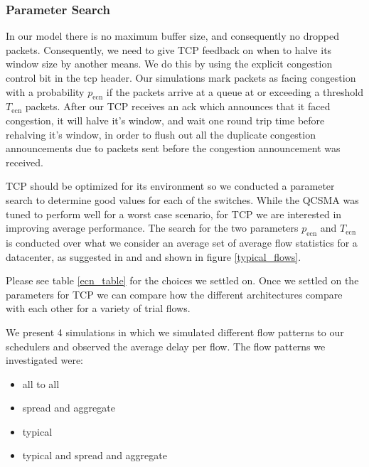 \documentclass{IEEEtran}%
\begin{document}
\subsubsection{Parameter Search}

In our model there is no maximum buffer size, and consequently no dropped packets.  Consequently, we need to give TCP feedback on when to halve its window size by another means.  We do this by using the explicit congestion control bit in the tcp header.  Our simulations mark packets as facing congestion with a probability $p_{\text{ecn}}$ if the packets arrive at a queue at or exceeding a threshold $T_{\text{ecn}}$ packets.  After our TCP receives an ack which announces that it faced congestion, it will halve it's window, and wait one round trip time before rehalving it's window, in order to flush out all the duplicate congestion announcements due to packets sent before the congestion announcement was received.

  TCP should be optimized for its environment so we conducted a parameter search to determine good values for each of the switches.  While the QCSMA was tuned to perform well for a worst case scenario, for TCP we are interested in improving average performance.  The search for the two parameters $p_{\text{ecn}}$ and $T_{\text{ecn}}$ is conducted over what we consider an average set of average flow statistics for a datacenter, as suggested in \cite{Benson} and \cite{Kandula} and shown in figure \ref{typical_flows}.

Please see table \ref{ecn_table} for the choices we settled on.  Once we settled on the parameters for TCP we can compare how the different architectures compare with each other for a variety of trial flows.  


We present 4 simulations in which we simulated different flow patterns to our schedulers and observed the average delay per flow.  The flow patterns we investigated were:

\begin{itemize}
\item all to all 
\item spread and aggregate 
\item typical 
\item typical and spread and aggregate
\end{itemize}
\end{document}
